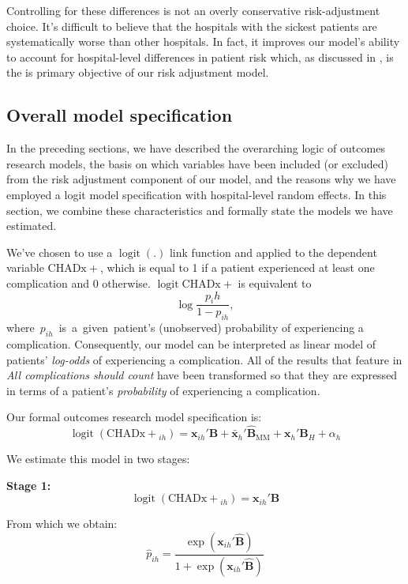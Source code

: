 \documentclass[submission]{grattan}
\newcommand*{\myTitle}{All complications should count}
\begin{document}
Controlling for these differences is not an overly conservative risk-adjustment choice.
It's difficult to believe that the hospitals with the sickest patients are systematically worse than other hospitals.
In fact, it improves our model's ability to account for hospital-level differences in patient risk which, as discussed in , is the is primary objective of our risk adjustment model.



\subsection{Overall model specification}\label{subsec:overall-model-specification}

In the preceding sections, we have described the overarching logic of outcomes research models, the basis on which variables have been included (or excluded) from the risk adjustment component of our model, and the reasons why we have employed a logit model specification with hospital-level random effects.
In this section, we combine these characteristics and formally state the models we have estimated.

We've chosen to use a \(\operatorname{logit}(.)\) link function and applied to the dependent variable \(\mathrm{CHADx+}\), which is equal to 1 if a patient experienced at least one complication and 0 otherwise\@. \(\operatorname{logit}\mathrm{CHADx+}\) is equivalent to \[\log\frac{p_ih}{1 - p_{{ih}}},\]
\null\hfill \mbox{where \(p_{{ih}}\) is a given patient's}
(unobserved) probability of experiencing a complication.
Consequently, our model can be interpreted as linear model of patients' \emph{log-odds} of experiencing a complication.
All of the results that feature in \textit{\myTitle{}} have been transformed so that they are expressed in terms of a patient's \emph{probability} of experiencing a complication.

Our formal outcomes research model specification is:
\[\operatorname{logit}(\mathrm{CHADx+}_{ih}) = \mathbf{x}_{ih}'\mathbf{B}+ \bar{\mathbf{x}}_{h}'\hat{\mathbf{B}}_{\text{MM}} + \mathbf{x}_{h}'\mathbf{B}_{H} + \alpha_{h}\]

We estimate this model in two stages:

\textbf{Stage 1:}
\[\operatorname{logit}\left(\mathrm{CHADx+}_{{ih}} \right) = \mathbf{x}_{{ih}}'\mathbf{B}\]

From which we obtain:
\[{\hat{p}}_{{ih}} = \frac{\exp(\mathbf{x}_{{ih}}'\hat{\mathbf{B}})}{1 + \exp(\mathbf{x}_{{ih}}'\hat{\mathbf{B}})}\]
\end{document}
